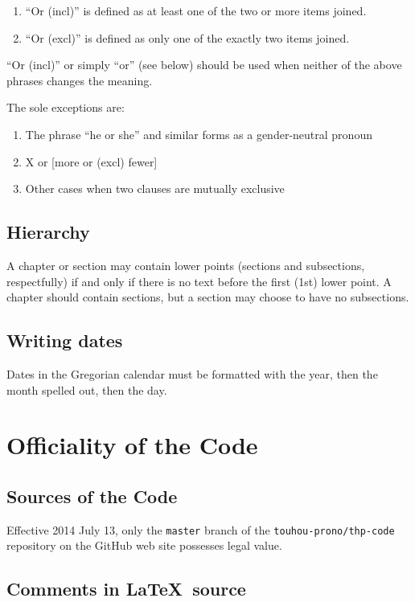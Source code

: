 \documentclass[10pt]{book}
\begin{document}
\begin{enumerate}
 \item ``Or (incl)'' is defined as at least one of the two or more items joined.
 \item ``Or (excl)'' is defined as only one of the exactly two items joined.
\end{enumerate}

``Or (incl)'' or simply ``or'' (see below) should be used when neither of the above phrases changes the meaning.

The sole exceptions are:
\begin{enumerate}
 \item The phrase ``he or she'' and similar forms as a gender-neutral pronoun
 \item X or [more or (excl) fewer]
 \item Other cases when two clauses are mutually exclusive
\end{enumerate}

\section{Hierarchy}

A chapter or section may contain lower points (sections and subsections, respectfully) if and only if there is no text before the first (1st) lower point. A chapter should contain sections, but a section may choose to have no subsections.

\section{Writing dates}

Dates in the Gregorian calendar must be formatted with the year, then the month spelled out, then the day.

\chapter{Officiality of the Code}

\section{Sources of the Code}

Effective 2014 July 13, only the \texttt{master} branch of the \texttt{touhou-prono/thp-code} repository on the GitHub web site possesses legal value.

\section{Comments in \LaTeX\ source}
\end{document}
